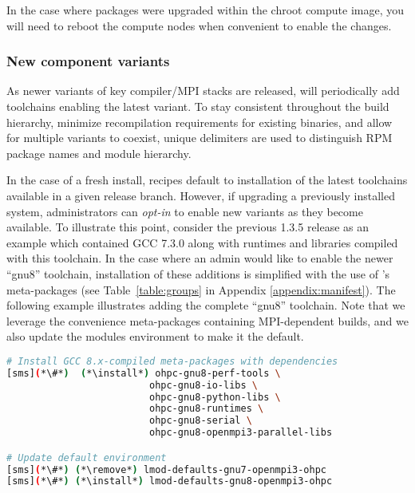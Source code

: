 \noindent In the case where packages were upgraded within the chroot compute image,
you will need to reboot the compute nodes when convenient to enable the
changes.

\subsubsection{New component variants}

As newer variants of key compiler/MPI stacks are released, \OHPC{} will
periodically add toolchains enabling the latest variant. To stay consistent
throughout the build hierarchy, minimize recompilation requirements for existing
binaries, and allow for multiple variants to coexist, unique delimiters are
used to distinguish RPM package names and module hierarchy.

In the case of a fresh install, \OHPC{} recipes default to installation of the
latest toolchains available in a given release branch. However, if upgrading a
previously installed system, administrators can {\em opt-in} to enable new
variants as they become available. To illustrate this point, consider the
previous \OHPC{} 1.3.5 release as an example which contained GCC 7.3.0
along with runtimes and libraries compiled with this toolchain.  In the case
where an admin would like to enable the newer {``gnu8''} toolchain,
installation of these additions is simplified with the use of \OHPC{}'s
meta-packages (see Table~\ref{table:groups} in Appendix
\ref{appendix:manifest}).  The following example illustrates adding the
complete ``gnu8'' toolchain.  Note that we leverage the convenience
meta-packages containing MPI-dependent builds, and we also update the
modules environment to make it the default.

\begin{lstlisting}[language=bash,keywords={}]
# Install GCC 8.x-compiled meta-packages with dependencies
[sms](*\#*)  (*\install*) ohpc-gnu8-perf-tools \
                         ohpc-gnu8-io-libs \
                         ohpc-gnu8-python-libs \
                         ohpc-gnu8-runtimes \
                         ohpc-gnu8-serial \
                         ohpc-gnu8-openmpi3-parallel-libs

# Update default environment
[sms](*\#*) (*\remove*) lmod-defaults-gnu7-openmpi3-ohpc
[sms](*\#*) (*\install*) lmod-defaults-gnu8-openmpi3-ohpc

\end{lstlisting}

